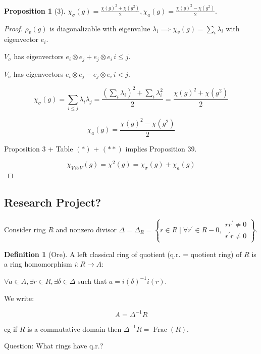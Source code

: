 \documentclass{article}
\theoremstyle{definition}
\newtheorem*{definition}{Definition}
\newtheorem{proposition}[theorem]{Proposition}
\begin{document}
\begin{proposition}
    [3] \(\chi_\sigma (g) = \frac{\chi(g)^2 + \chi(g^2)}{2}, \chi_a(g) = \frac{\chi(g)^2 - \chi(g^2)}{2}\). 
\end{proposition}

\begin{proof}
    \(\rho_v(g)\) is diagonalizable with eigenvalue \(\lambda_i \implies \chi_v(g) = \sum_{i} \lambda_i\) with eigenvector \(e_i\).

    \(V_\sigma\) has eigenvectors \(e_i \otimes e_j + e_j \otimes e_i \, i \leq j\).

    \(V_a\) has eigenvectors \(e_i \otimes e_j - e_j \otimes e_i\, i < j\).

    \[
        \chi_\sigma (g) = \sum_{i \leq j} \lambda_i \lambda_j = \frac{\left( \sum_{i} \lambda_i \right)^2 + \sum_{i} \lambda_i^{2}}{2} = \frac{\chi(g)^2 + \chi(g^2)}{2}
    \]

    \[
        \chi_a(g) = \frac{\chi(g)^2 - \chi(g^2)}{2}
    \]

    Proposition 3 + Table \((\ast)\) + \((\ast \ast)\) implies Proposition 39.

    \[
        \chi_{V \otimes V}(g) = \chi^2(g) = \chi_\sigma (g) + \chi_a(g)
    \]

\end{proof}

\subsection*{Research Project?}

Consider ring \(R\) and nonzero divisor \(\Delta = \Delta_R = \left\{ r \in R \mid \forall r^{\prime} \in R - 0, \substack{r r^{\prime} \neq 0 \\ r^{\prime} r \neq 0} \right\} \).

\begin{definition}
    [Ore] A left classical ring of quotient (q.r. = quotient ring) of \(R\) is a ring homomorphism \(i:R \to A\):

    \(\forall a\in A, \exists r\in R, \exists \delta \in \Delta\) such that \(a = i(\delta)^{-1} i(r)\).

    We write:

    \[
        A = \Delta ^{-1} R
    \]
\end{definition}

eg if \(R\) is a commutative domain then \(\Delta ^{-1} R = \operatorname{Frac}(R)\).

Question: What rings have q.r.?
\end{document}
